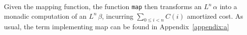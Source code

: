 Given the mapping function, the function \texttt{map} then transforms an $L^n \, \alpha$ into a monadic computation of an $L^n \, \beta$, incurring $\sum_{0 \leq i < n} C(i)$ amortized cost. As usual, the term implementing map can be found in Appendix~\ref{appendix:a}






